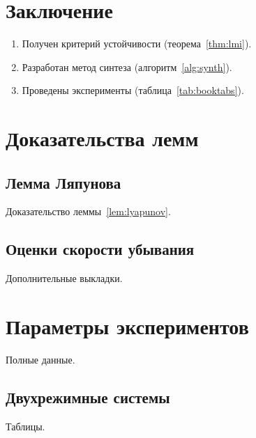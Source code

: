 \documentclass[font=modern]{cmcmsuthesis-doctoral}
\begin{document}
\chapter*{Заключение}
\begin{enumerate}
\item Получен критерий устойчивости (теорема~\ref{thm:lmi}).
\item Разработан метод синтеза (алгоритм~\ref{alg:synth}).
\item Проведены эксперименты (таблица~\ref{tab:booktabs}).
\end{enumerate}

\clearpage\listoftables{}
\printbibliography[heading=bibintoc]

\appendix
\chapter{Доказательства лемм}
\section{Лемма Ляпунова}
Доказательство леммы~\ref{lem:lyapunov}.
\section{Оценки скорости убывания}
Дополнительные выкладки.

\chapter{Параметры экспериментов}
Полные данные.
\section{Двухрежимные системы}
Таблицы.
\end{document}
